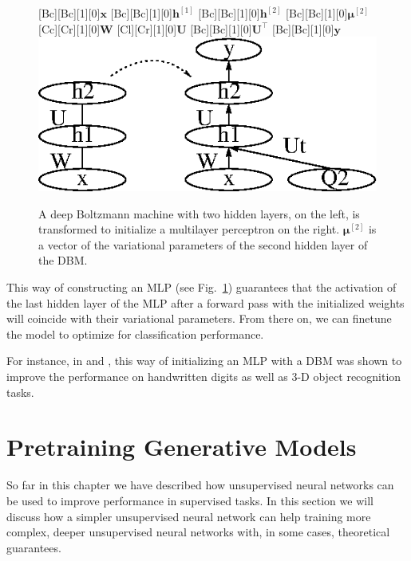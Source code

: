 \documentclass{now}
\newcommand{\qlay}[1]{\left[#1\right]}
\newcommand{\vect}[1]{\mathbf{#1}}
\newcommand{\vects}[1]{\boldsymbol{#1}}
\newcommand{\matr}[1]{\mathbf{#1}}
\newcommand{\vh}[0]{\vect{h}}
\newcommand{\vx}[0]{\vect{x}}
\newcommand{\vy}[0]{\vect{y}}
\newcommand{\mW}[0]{\matr{W}}
\newcommand{\mU}[0]{\matr{U}}
\newcommand{\vmu}[0]{\vects{\mu}}
\begin{document}
\begin{figure}[t]
    \centering
    [Bc][Bc][1][0]{$\vx$}
    [Bc][Bc][1][0]{$\vh^{\qlay{1}}$}
    [Bc][Bc][1][0]{$\vh^{\qlay{2}}$}
    [Bc][Bc][1][0]{$\vmu^{\qlay{2}}$}
    [Cc][Cr][1][0]{$\mW$}
    [Cl][Cr][1][0]{$\mU$}
    [Bc][Bc][1][0]{$\mU^\top$}
    [Bc][Bc][1][0]{$\vy$}
    \includegraphics[width=0.75\columnwidth]{../figures/dbm_mlp.eps}
    \caption{A deep Boltzmann machine with two hidden
    layers, on the left, is transformed to initialize a
    multilayer perceptron on the right. $\vmu^{\qlay{2}}$ is a
    vector of the variational parameters of the second
    hidden layer of the DBM.}
    \label{fig:dbm_mlp}
\end{figure}

This way of constructing an MLP (see Fig.~\ref{fig:dbm_mlp}) guarantees that the
activation of the last hidden layer of the MLP after a forward pass with the
initialized weights will coincide with their variational parameters. From there
on, we can finetune the model to optimize for classification performance.

For instance, in \citep{Salakhutdinov2009a} and \citep{Hinton2012}, this way of
initializing an MLP with a DBM was shown to improve the performance on
handwritten digits as well as 3-D object recognition tasks.





\section{Pretraining Generative Models}
\label{sec:pretrain_gen}


So far in this chapter we have described how unsupervised neural networks can be
used to improve performance in supervised tasks. In this section we will discuss
how a simpler unsupervised neural network can help training more complex, deeper
unsupervised neural networks with, in some cases, theoretical guarantees.
\end{document}
